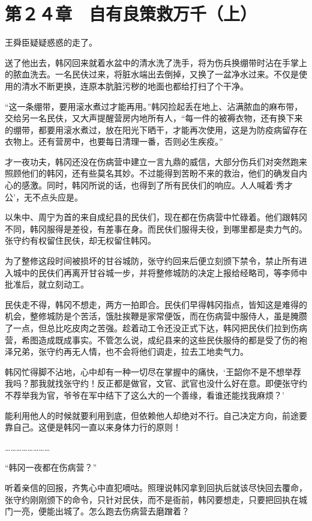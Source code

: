 \section{第２４章　自有良策救万千（上）}

王舜臣疑疑惑惑的走了。

送了他出去，韩冈回来就着水盆中的清水洗了洗手，将为伤兵换绷带时沾在手掌上的脓血洗去。一名民伕过来，将脏水端出去倒掉，又换了一盆净水过来。不仅是使用的清水不断更换，连原本肮脏污秽的地面也都给打扫了个干净。

“这一条绷带，要用滚水煮过才能再用。”韩冈捡起丢在地上、沾满脓血的麻布带，交给另一名民伕，又大声提醒营房内地所有人，“每一件的被褥衣物，还有换下来的绷带，都要用滚水煮过，放在阳光下晒干，才能再次使用，这是为防疫病留存在衣物上。还有营房中，也要每日清理一番，否则必生疾疫。”

才一夜功夫，韩冈还没在伤病营中建立一言九鼎的威信，大部分伤兵们对突然跑来照顾他们的韩冈，还有些莫名其妙。不过能得到苦盼不来的救治，他们的确发自内心的感激。同时，韩冈所说的话，也得到了所有民伕们的响应。人人喊着‘秀才公’，无不点头应是。

以朱中、周宁为首的来自成纪县的民伕们，现在都在伤病营中忙碌着。他们跟韩冈不同，韩冈服得是差役，有差事在身。而民伕们服得夫役，到哪里都是卖力气的。张守约有权留住民伕，却无权留住韩冈。

为了整修这段时间被损坏的甘谷城防，张守约回来后便立刻颁下禁令，禁止所有进入城中的民伕们再离开甘谷城一步，并将整修城防的决定上报给经略司，等李师中批准后，就立刻动工。

民伕走不得，韩冈不想走，两方一拍即合。民伕们早得韩冈指点，皆知这是难得的机会，整修城防是个苦活，饿肚挨鞭是家常便饭，而在伤病营中服侍人，虽是腌臜了一点，但总比吃皮肉之苦强。趁着动工令还没正式下达，韩冈把民伕们拉到伤病营，希图造成既成事实。不管怎么说，成纪县来的这些民伕服侍的都是受了伤的袍泽兄弟，张守约再无人情，也不会将他们调走，拉去工地卖气力。

韩冈忙得脚不沾地，心中却有一种一切尽在掌握中的痛快，‘王韶你不是不想举荐我吗？那我就找张守约！反正都是做官，文官、武官也没什么好在意。即便张守约不荐举我为官，爷爷在军中结下了这么大的一个善缘，看谁还能找我麻烦？’

能利用他人的时候就要利用到底，但依赖他人却绝对不行。自己决定方向，前途要靠自己。这便是韩冈一直以来身体力行的原则！

……………………

“韩冈一夜都在伤病营？”

听着亲信的回报，齐隽心中直犯嘀咕。照理说韩冈拿到回执后就该尽快回去覆命，张守约刚刚颁下的命令，只针对民伕，而不是衙前，韩冈要想走，只要把回执在城门一亮，便能出城了。怎么跑去伤病营去磨蹭着？

